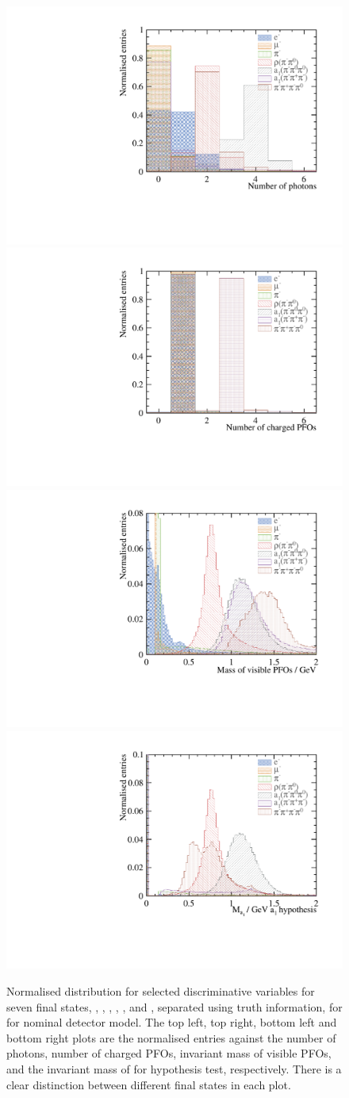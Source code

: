 \begin{figure}[htbp]
\centering 

\includegraphics[width=.45\textwidth]{tau/var/nPhoton_100GeV_improved}
\qquad
\includegraphics[width=.45\textwidth]{tau/var/nCharge_100GeV_improved}
\qquad
\includegraphics[width=.45\textwidth]{tau/var/mVis_100GeV_improved_zoom}
\qquad
\includegraphics[width=.45\textwidth]{tau/var/mA1A1Fit_100GeV_improved_zoom}
\qquad

\caption[]{
Normalised distribution for selected discriminative variables for seven final states, \decayElectron, \decayMuon, \decayPion, \decayRho, \decayAiPhoton, \decayAiPion and \decayThreePionPhoton, separated using truth information,  for  for nominal \CLICILD detector model. The top left, top right, bottom left and bottom right plots are the normalised entries against the number of photons, number of charged PFOs, invariant mass of visible PFOs, and the invariant mass of \decayAiPhotonShort for hypothesis test, respectively. There is a clear distinction between different final states in each plot.
}
\label{fig:tauVar}
\end{figure}

